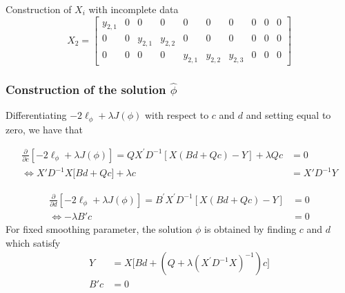 \begin{example}{Construction of $X_i$ with incomplete data}
\begin{equation}
X_2 =  \begin{bmatrix} 
y_{2, 1}  & 	0  &	  0           &    0            &    0   & 0 & 0 & 0 & 0 & 0  \\
0   	      &  	0  &	y_{2, 1}  &    y_{2,2}   &    0   &  0 & 0 & 0 & 0 & 0 \\
 0   	      &        0  &    0           &    0            &  y_{2, 1}    & y_{2, 2}& y_{2, 3} &    0   & 0  & 0
\end{bmatrix}
\end{equation}
\end{example}

\subsubsection{Construction of the solution $\hat{\phi}$}

Differentiating $-2\ell_\phi + \lambda J\left(\phi\right)$ with respect to $c$ and $d$ and setting equal to zero, we have that 

\begin{align}
\frac{\partial}{\partial c}\left[-2\ell_\phi + \lambda J\left(\phi\right)\right] = Q X^\prime D^{-1}\left[ X\left(Bd + Qc\right) - Y  \right] + \lambda Qc &= 0 \nonumber \\
\iff    X'D^{-1} X \bigg[ Bd + Qc \bigg] + \lambda c  &= X' D^{-1}Y \label{eq:normal-eq-1}
\end{align}

\begin{align}
\frac{\partial}{\partial d}\left[-2\ell_\phi + \lambda J\left(\phi\right)\right] = B^\prime X^\prime D^{-1}\left[ X\left(Bd + Qc\right) - Y  \right] &=0 \nonumber \\
\iff   - \lambda B' c  &= 0  
\end{align}
\bigskip
\noindent
For fixed smoothing parameter, the solution $\phi$ is obtained by finding $c$ and $d$ which satisfy
\begin{align} 
Y &= X \bigg[ Bd + \left(Q  + \lambda \left(X^\prime D^{-1} X \right)^{-1} \right) c \bigg] \label{eq:ssanova-normal-eq-1} \\
B' c  &= 0  \label{eq:ssanova-normal-eq-2}
\end{align}
\noindent


